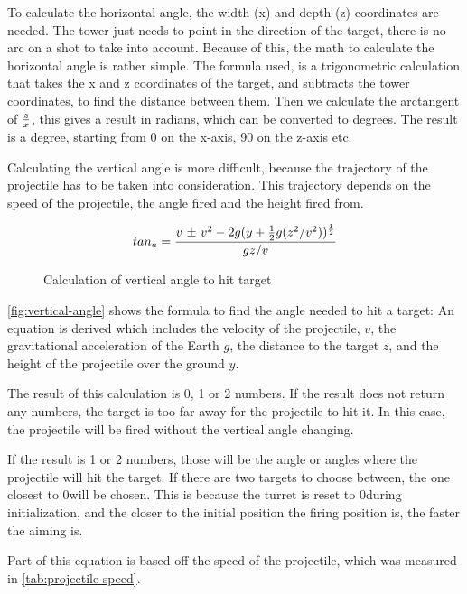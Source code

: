 

To calculate the horizontal angle, the width (x) and depth (z) coordinates are needed. The tower just needs to point in the direction of the target, there is no arc on a shot to take into account. Because of this, the math to calculate the horizontal angle is rather simple. The formula used, is a trigonometric calculation that takes the x and z coordinates of the target, and subtracts the tower coordinates, to find the distance between them. Then we calculate the arctangent of $z \over x$, this gives a result in radians, which can be converted to degrees. The result is a degree, starting from 0 on the x-axis, 90 on the z-axis etc.

Calculating the vertical angle is more difficult, because the trajectory of the projectile has to be taken into consideration. This trajectory depends on the speed of the projectile, the angle fired and the height fired from.

\begin{figure}[htbp]
$$tan_a = {v \text{ \textpm} \text{ } v^2 - 2g(y + {1 \over 2}g(z^2/v^2))^{1 \over 2} \over gz/v}$$
\caption{Calculation of vertical angle to hit target}
\label{fig:vertical-angle}
\end{figure}

\autoref{fig:vertical-angle} shows the formula to find the angle needed to hit a target: An equation is derived which includes the velocity of the projectile, $v$, the gravitational acceleration of the Earth $g$, the distance to the target $z$, and the height of the projectile over the ground $y$. 

The result of this calculation is 0, 1 or 2 numbers. If the result does not return any numbers, the target is too far away for the projectile to hit it. In this case, the projectile will be fired without the vertical angle changing. 

If the result is 1 or 2 numbers, those will be the angle or angles where the projectile will hit the target. If there are two targets to choose between, the one closest to 0\textdegree will be chosen. This is because the turret is reset to 0\textdegree \text{ }during initialization, and the closer to the initial position the firing position is, the faster the aiming is. 

Part of this equation is based off the speed of the projectile, which was measured in \autoref{tab:projectile-speed}. 
